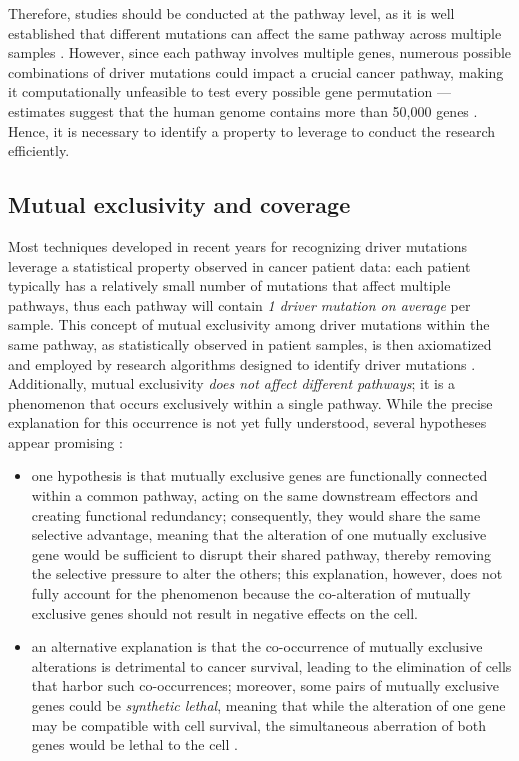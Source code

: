 Therefore, studies should be conducted at the pathway level, as it is well established that different mutations can affect the same pathway across multiple samples \cite{multi-dendrix}. However, since each pathway involves multiple genes, numerous possible combinations of driver mutations could impact a crucial cancer pathway, making it computationally unfeasible to test every possible gene permutation \cite{dendrix} --- estimates suggest that the human genome contains more than 50,000 genes \cite{n-genes}. Hence, it is necessary to identify a property to leverage to conduct the research efficiently.

\subsection{Mutual exclusivity and coverage}

Most techniques developed in recent years for recognizing driver mutations leverage a statistical property observed in cancer patient data: each patient typically has a relatively small number of mutations that affect multiple pathways, thus each pathway will contain \textit{1 driver mutation on average} per sample. This concept of mutual exclusivity among driver mutations within the same pathway, as statistically observed in patient samples, is then axiomatized and employed by research algorithms designed to identify driver mutations \cite{multi-dendrix}. Additionally, mutual exclusivity \textit{does not affect different pathways}; it is a phenomenon that occurs exclusively within a single pathway. While the precise explanation for this occurrence is not yet fully understood, several hypotheses appear promising \cite{survey, mutual_exclusivity_expls, dendrix}:

\begin{itemize}
    \item one hypothesis is that mutually exclusive genes are functionally connected within a common pathway, acting on the same downstream effectors and creating functional redundancy; consequently, they would share the same selective advantage, meaning that the alteration of one mutually exclusive gene would be sufficient to disrupt their shared pathway, thereby removing the selective pressure to alter the others; this explanation, however, does not fully account for the phenomenon because the co-alteration of mutually exclusive genes should not result in negative effects on the cell.
    \item an alternative explanation is that the co-occurrence of mutually exclusive alterations is detrimental to cancer survival, leading to the elimination of cells that harbor such co-occurrences; moreover, some pairs of mutually exclusive genes could be \textit{synthetic lethal}, meaning that while the alteration of one gene may be compatible with cell survival, the simultaneous aberration of both genes would be lethal to the cell .
\end{itemize}

